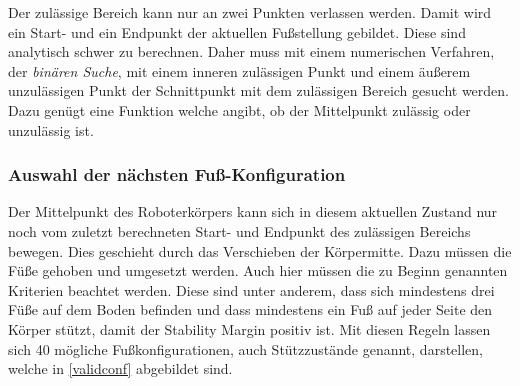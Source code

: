 Der zulässige Bereich kann nur an zwei Punkten verlassen werden. Damit wird ein Start- und ein Endpunkt der aktuellen Fußstellung gebildet. Diese sind analytisch schwer zu berechnen. Daher muss mit einem numerischen Verfahren, der \emph{binären Suche}, mit einem inneren zulässigen Punkt und einem äußerem unzulässigen Punkt der Schnittpunkt mit dem zulässigen Bereich gesucht werden. Dazu genügt eine Funktion welche angibt, ob der Mittelpunkt zulässig oder unzulässig ist.

\subsubsection{Auswahl der nächsten Fuß-Konfiguration}

Der Mittelpunkt des Roboterkörpers kann sich in diesem aktuellen Zustand nur noch vom zuletzt berechneten Start- und Endpunkt des zulässigen Bereichs bewegen. Dies geschieht durch das Verschieben der Körpermitte. Dazu müssen die Füße gehoben und umgesetzt werden. Auch hier müssen die zu Beginn genannten Kriterien beachtet werden. Diese sind unter anderem, dass sich mindestens drei Füße auf dem Boden befinden und dass mindestens ein Fuß auf jeder Seite den Körper stützt, damit der Stability Margin positiv ist. Mit diesen Regeln lassen sich 40 mögliche Fußkonfigurationen, auch Stützzustände genannt, darstellen, welche in \autoref{validconf} abgebildet sind.

